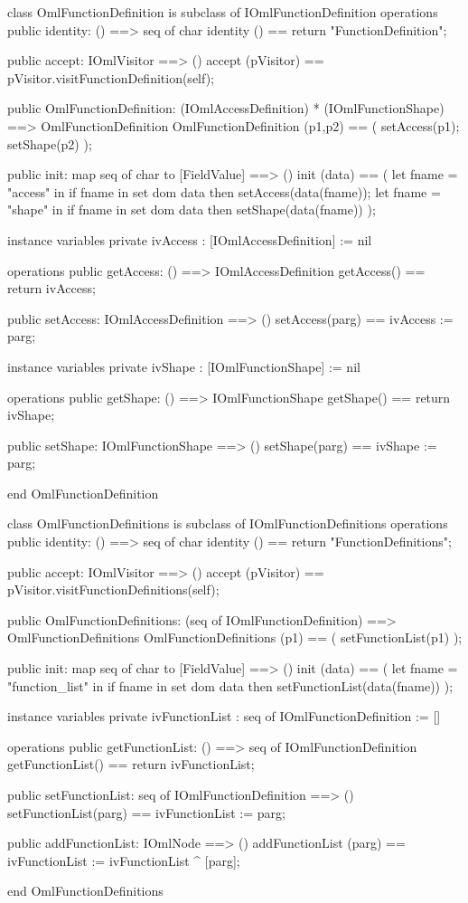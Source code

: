 \begin{vdm_al}
class OmlFunctionDefinition is subclass of IOmlFunctionDefinition
operations
  public identity: () ==> seq of char
  identity () == return "FunctionDefinition";

  public accept: IOmlVisitor ==> ()
  accept (pVisitor) == pVisitor.visitFunctionDefinition(self);

  public OmlFunctionDefinition:
      (IOmlAccessDefinition) *
      (IOmlFunctionShape) ==> OmlFunctionDefinition
  OmlFunctionDefinition (p1,p2) == 
   ( setAccess(p1);
     setShape(p2) );

  public init: map seq of char to [FieldValue] ==> ()
  init (data) ==
    ( let fname = "access" in
        if fname in set dom data
        then setAccess(data(fname));
      let fname = "shape" in
        if fname in set dom data
        then setShape(data(fname)) );

instance variables
  private ivAccess : [IOmlAccessDefinition] := nil

operations
  public getAccess: () ==> IOmlAccessDefinition
  getAccess() == return ivAccess;

  public setAccess: IOmlAccessDefinition ==> ()
  setAccess(parg) == ivAccess := parg;

instance variables
  private ivShape : [IOmlFunctionShape] := nil

operations
  public getShape: () ==> IOmlFunctionShape
  getShape() == return ivShape;

  public setShape: IOmlFunctionShape ==> ()
  setShape(parg) == ivShape := parg;

end OmlFunctionDefinition
\end{vdm_al}

\begin{vdm_al}
class OmlFunctionDefinitions is subclass of IOmlFunctionDefinitions
operations
  public identity: () ==> seq of char
  identity () == return "FunctionDefinitions";

  public accept: IOmlVisitor ==> ()
  accept (pVisitor) == pVisitor.visitFunctionDefinitions(self);

  public OmlFunctionDefinitions:
      (seq of IOmlFunctionDefinition) ==> OmlFunctionDefinitions
  OmlFunctionDefinitions (p1) == 
   ( setFunctionList(p1) );

  public init: map seq of char to [FieldValue] ==> ()
  init (data) ==
    ( let fname = "function_list" in
        if fname in set dom data
        then setFunctionList(data(fname)) );

instance variables
  private ivFunctionList : seq of IOmlFunctionDefinition := []

operations
  public getFunctionList: () ==> seq of IOmlFunctionDefinition
  getFunctionList() == return ivFunctionList;

  public setFunctionList: seq of IOmlFunctionDefinition ==> ()
  setFunctionList(parg) == ivFunctionList := parg;

  public addFunctionList: IOmlNode ==> ()
  addFunctionList (parg) == ivFunctionList := ivFunctionList ^ [parg];

end OmlFunctionDefinitions
\end{vdm_al}

